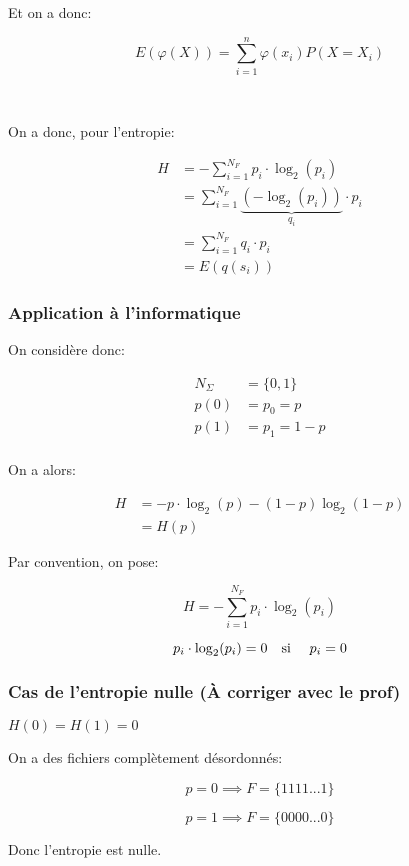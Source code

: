 \documentclass[a4paper,11pt]{article}
\newcommand{\ti}{\cdot}
\begin{document}
Et on a donc:

$$ E(\varphi(X)) = \sum_{i = 1}^n \varphi(x_i) P(X = X_i) $$

\

On a donc, pour l'entropie:

\begin{align*}
  H &= - \sum_{i = 1}^{N_F}p_i \ti \log_2(p_i) \\
    &= \sum_{i = 1}^{N_F} \underbrace{(- \log_2(p_i))}_{q_i} \ti p_i \\
    &= \sum_{i = 1}^{N_F} q_i \ti p_i \\
    &= E(q(s_i))
\end{align*}

\subsubsection{Application à l'informatique}

On considère donc:

\begin{align*}
  N_\Sigma &= \{0, 1\} \\
  p(0) &= p_0 = p \\
  p(1) &= p_1 = 1 - p \\
\end{align*}

On a alors:

\begin{align*}
  H &= -p \ti \log_2(p) - (1 - p) \log_2(1 - p) \\
    &= H(p)
\end{align*}

Par convention, on pose:

$$ H = - \sum_{i = 1}^{N_F}p_i \ti \log_2(p_i) $$

$$ p_i \ti \log_2(p_i) = 0 \text{\quad si \quad} p_i = 0 $$

\subsubsection{Cas de l'entropie nulle (À corriger avec le prof)}

$H(0) = H(1) = 0$

On a des fichiers complètement désordonnés:

$$ p = 0 \implies F = \{1111...1\} $$

$$ p = 1 \implies F = \{0000...0\} $$

Donc l'entropie est nulle.


\
\end{document}
